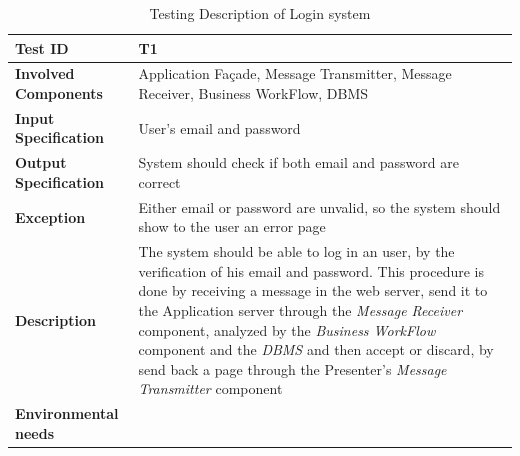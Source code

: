 \begin{table}[H]
    \centering
    \begin{tabular}{p{4.55cm} p{7cm}}
        
        \hline
        
        \textbf{Test ID}                & T1 \\
        
        \hline
        
        \textbf{Involved Components}    & Application Façade, Message Transmitter, Message Receiver, Business                                          WorkFlow, DBMS\\
        
        \hline
        
        \textbf{Input Specification}    & User's email and password\\
        
        \hline
        
        \textbf{Output Specification}   & System should check if both email and password are correct\\
        
        \hline
        
        \textbf{Exception}              & Either email or password are unvalid, so the system should show to the                                       user an error page\\
        
        \hline
        
        \textbf{Description}            & The system should be able to log in an user, by the verification of his                                      email and password. This procedure is done by receiving a message in the web server, send it to the Application server through the \emph{Message Receiver} component, analyzed by the \emph{Business WorkFlow} component and the \emph{DBMS} and then accept or discard, by send back a page through the Presenter's \emph{Message Transmitter} component\\
        
        \hline
        
        \textbf{Environmental needs}    & \\
        
        \hline
        
    \end{tabular}
    \caption{Testing Description of Login system}
\end{table}



